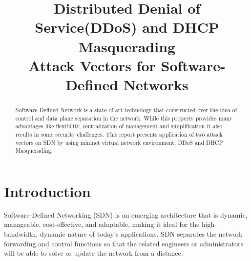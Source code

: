 \documentclass[conference,compsoc]{IEEEtran}
\begin{document}
%
\title{Distributed Denial of Service(DDoS) and DHCP Masquerading\\ Attack Vectors for Software-Defined Networks}


\author{
\and
{}
}



\maketitle

\begin{abstract}
Software-Defined Network is a state of art technology that constructed over the idea of control and data plane separation in the network. While this property provides many advantages like flexibility, centralization of management and simplification it also results in some security challenges. This report presents application of two attack vectors on SDN by using mininet virtual network environment; DDoS and DHCP Masquerading.
\end{abstract}

\IEEEpeerreviewmaketitle



\section{Introduction}
Software-Defined Networking (SDN) is an emerging architecture that is dynamic, manageable, cost-effective, and adaptable, making it ideal for the high-bandwidth, dynamic nature of today’s applications\cite{OpenNetworking}. SDN separates the network forwarding and control functions so that the related engineers or administrators will be able to solve or update the network from a distance.
\end{document}
